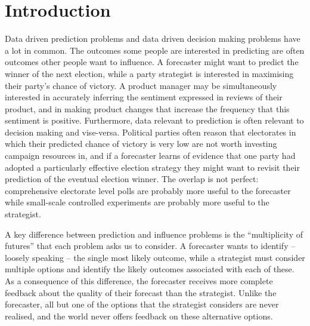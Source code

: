 


\chapter{Introduction}\label{ch:introduction}


Data driven prediction problems and data driven decision making problems have a lot in common. The outcomes some people are interested in predicting are often outcomes other people want to influence. A forecaster might want to predict the winner of the next election, while a party strategist is interested in maximising their party's chance of victory. A product manager may be simultaneously interested in accurately inferring the sentiment expressed in reviews of their product, and in making product changes that increase the frequency that this sentiment is positive. Furthermore, data relevant to prediction is often relevant to decision making and vise-versa. Political parties often reason that electorates in which their predicted chance of victory is very low are not worth investing campaign resources in, and if a forecaster learns of evidence that one party had adopted a particularly effective election strategy they might want to revisit their prediction of the eventual election winner. The overlap is not perfect: comprehensive electorate level polls are probably more useful to the forecaster while small-scale controlled experiments are probably more useful to the strategist.

A key difference between prediction and influence problems is the ``multiplicity of futures'' that each problem asks us to consider. A forecaster wants to identify -- loosely speaking -- the single most likely outcome, while a strategist must consider multiple options and identify the likely outcomes associated with each of these. As a consequence of this difference, the forecaster receives more complete feedback about the quality of their forecast than the strategist. Unlike the forecaster, all but one of the options that the strategist considers are never realised, and the world never offers feedback on these alternative options.

